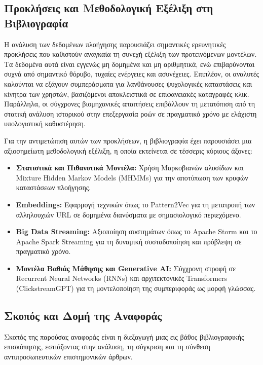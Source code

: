 \documentclass[12pt,a4paper]{article}
\begin{document}
    \subsection{Προκλήσεις και Μεθοδολογική Εξέλιξη στη Βιβλιογραφία}
    Η ανάλυση των δεδομένων πλοήγησης παρουσιάζει σημαντικές ερευνητικές προκλήσεις που καθιστούν αναγκαία τη συνεχή εξέλιξη των προτεινόμενων μοντέλων. Τα δεδομένα αυτά είναι εγγενώς μη δομημένα και μη αριθμητικά, ενώ επιβαρύνονται συχνά από σημαντικό θόρυβο, τυχαίες ενέργειες και ασυνέχειες. Επιπλέον, οι αναλυτές καλούνται να εξάγουν συμπεράσματα για λανθάνουσες ψυχολογικές καταστάσεις και κίνητρα των χρηστών, βασιζόμενοι αποκλειστικά σε επιφανειακές καταγραφές κλικ. Παράλληλα, οι σύγχρονες βιομηχανικές απαιτήσεις επιβάλλουν τη μετατόπιση από τη στατική ανάλυση ιστορικού στην επεξεργασία ροών σε πραγματικό χρόνο με ελάχιστη υπολογιστική καθυστέρηση.
    
    Για την αντιμετώπιση αυτών των προκλήσεων, η βιβλιογραφία έχει παρουσιάσει μια αξιοσημείωτη μεθοδολογική εξέλιξη, η οποία εκτείνεται σε τέσσερις κύριους άξονες:
    \begin{itemize}
    	\item \textbf{Στατιστικά και Πιθανοτικά Μοντέλα:} Χρήση Μαρκοβιανών αλυσίδων και Mixture Hidden Markov Models (MHMMs) για την αποτύπωση των κρυφών καταστάσεων πλοήγησης.
    	\item \textbf{Embeddings:} Εφαρμογή τεχνικών όπως το Pattern2Vec για τη μετατροπή των αλληλουχιών URL σε δομημένα διανύσματα με σημασιολογικό περιεχόμενο.
    	\item \textbf{Big Data Streaming:} Αξιοποίηση συστημάτων όπως το Apache Storm και το Apache Spark Streaming για τη δυναμική συσταδοποίηση και πρόβλεψη σε πραγματικό χρόνο.
    	\item \textbf{Μοντέλα Βαθιάς Μάθησης και Generative AI:} Σύγχρονη στροφή σε Recurrent Neural Networks (RNNs) και αρχιτεκτονικές Transformers (ClickstreamGPT) για τη μοντελοποίηση της συμπεριφοράς ως μορφή γλώσσας.
    \end{itemize}
    
    \subsection{Σκοπός και Δομή της Αναφοράς}
    Σκοπός της παρούσας αναφοράς είναι η διεξαγωγή μιας εις βάθος βιβλιογραφικής επισκόπησης, εστιάζοντας στην ανάλυση, τη σύγκριση και τη σύνθεση αντιπροσωπευτικών επιστημονικών άρθρων.
    
\end{document}
